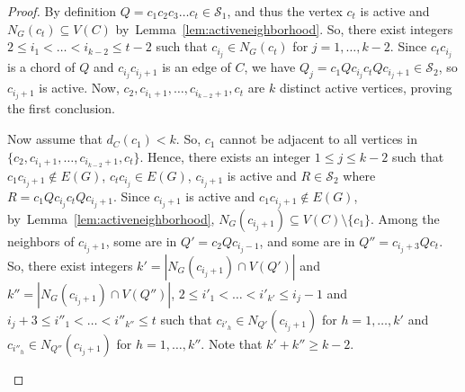 \documentclass[11pt]{article}
\begin{document}
\begin{proof}
    By definition $Q =c_1c_2 c_3 \dots c_t \in \mathcal S_1$, and thus the vertex $c_t$ is active and $N_G(c_t)\subseteq V(C)$ by~Lemma~\ref{lem:activeneighborhood}. So, there exist integers $2 \leq i_1 < \dots < i_{k-2} \leq t-2$ such that  $c_{i_j}\in N_G(c_t)$ for $j=1, \dots, k-2$. Since $c_tc_{i_j}$ is a chord of $Q$ and $c_{i_j}c_{i_j+1}$ is an edge of $C$, we have $Q_j = c_1Qc_{i_j}c_tQc_{i_j+1} \in\mathcal S_2$, so $c_{i_j+1}$ is active.  Now, $c_2, c_{i_1+1}, \dots, c_{i_{k-2}+1}, c_t$ are $k$ distinct active vertices, proving the first conclusion. 
     
   Now assume that $d_C(c_1)<k$. So, $c_1$ cannot be adjacent to all vertices in $\{c_2, c_{i_1+1}, \dots, c_{i_{k-2}+1}, c_t\}$. Hence, there exists an integer $1\leq j \leq k-2$ such that $c_1c_{{i_j}+1}\notin E(G)$, $c_tc_{i_j}\in E(G)$, $c_{{i_j}+1}$ is active and $R\in \mathcal S_2$ where $R=c_1Qc_{i_j}c_tQc_{{i_j}+1}$. Since $c_{{i_j}+1}$ is active and $c_1c_{{i_j}+1}\notin E(G)$, by~Lemma~\ref{lem:activeneighborhood}, $N_G(c_{{i_j}+1})\subseteq V(C)\setminus\{c_1\}$. Among the neighbors of $c_{{i_j}+1}$, some are in $Q' = c_2 Q c_{{i_j}-1}$, and some are in $Q''=c_{{i_j}+3} Qc_t$.  
   So, there exist integers $k' = |N_G(c_{{i_j}+1})\cap V(Q')|$ and $k'' = |N_G(c_{{i_j}+1})\cap V(Q'')|$, $2 \leq i'_1 < \dots < i'_{k'} \leq {i_j}-1$ and ${i_j}+3 \leq i''_1 < \dots < i''_{k''} \leq t$ such that $c_{i'_h} \in N_{Q'}(c_{{i_j}+1})$ for $h=1, \dots, k'$ and $c_{i''_h} \in N_{Q''}(c_{{i_j}+1})$ for $h=1, \dots, k''$.  Note that $k'+k'' \ge k-2$. 

\begin{figure}[ht]
\centering

\end{figure}
\end{proof}
\end{document}
